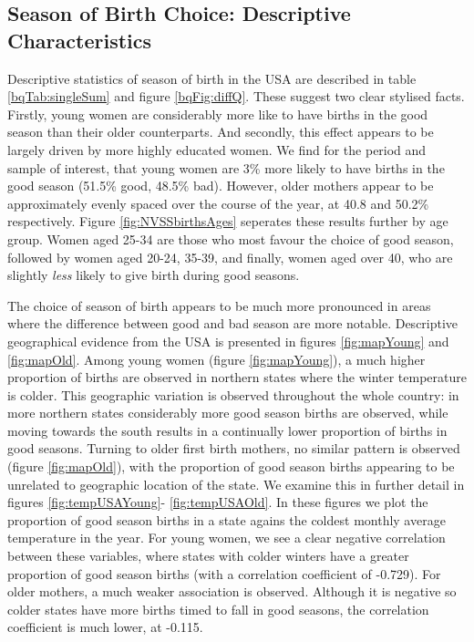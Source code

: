 \documentclass[a4paper, 11 pt]{article}
\theoremstyle{plain}
\begin{document}
\begin{spacing}{1.4}
\subsection{Season of Birth Choice: Descriptive Characteristics}
Descriptive statistics of season of birth in the USA are described in table 
\ref{bqTab:singleSum} and figure \ref{bqFig:diffQ}.  These suggest two clear
stylised facts.  Firstly, young women are considerably more like to have births
in the good season than their older counterparts.  And secondly, this effect 
appears to be largely driven by more highly educated women.  We find for the 
period and sample of interest, that young women are 3\% more likely to have 
births in the good season (51.5\% good, 48.5\% bad).  However, older mothers
appear to be approximately evenly spaced over the course of the year, at 40.8
and 50.2\% respectively. Figure \ref{fig:NVSSbirthsAges} seperates these results 
further by age group. Women aged 25-34 are those who most favour the choice of
good season, followed by women aged 20-24, 35-39, and finally, women aged over
40, who are slightly \emph{less} likely to give birth during good seasons.

The choice of season of birth appears to be much more pronounced in areas where
the difference between good and bad season are more notable.  Descriptive
geographical evidence from the USA is presented in figures \ref{fig:mapYoung} 
and \ref{fig:mapOld}. Among young women (figure \ref{fig:mapYoung}), a much 
higher proportion of births are observed in northern states where the winter
temperature is colder.  This geographic variation is observed throughout the
whole country: in more northern states considerably more good season births
are observed, while moving towards the south results in a continually lower
proportion of births in good seasons.  Turning to older first birth mothers, no
similar pattern is observed (figure \ref{fig:mapOld}), with the proportion of 
good season births appearing to be unrelated to geographic location of the state.
We examine this in further detail in figures \ref{fig:tempUSAYoung}-%
\ref{fig:tempUSAOld}.  In these figures we plot the proportion of good season
births in a state agains the coldest monthly average temperature in the year.
For young women, we see a clear negative correlation between these variables, 
where states with colder winters have a greater proportion of good season births
(with a correlation coefficient of -0.729).  For older mothers, a much weaker
association is observed.  Although it is negative so colder states have more
births timed to fall in good seasons, the correlation coefficient is much lower,
at -0.115.




\end{spacing}
\end{document}
